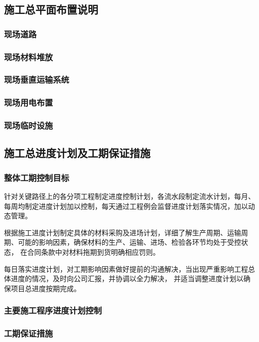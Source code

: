 \subsection{施工总平面布置说明}
\subsubsection{现场道路}
\subsubsection{现场材料堆放}
\subsubsection{现场垂直运输系统}
\subsubsection{现场用电布置}
\subsubsection{现场临时设施}

\subsection{施工总进度计划及工期保证措施}
\subsubsection{整体工期控制目标}

针对关键路径上的各分项工程制定进度控制计划，各流水段制定流水计划，每月、每周均制定进度计划加以控制，每天通过工程例会监督进度计划落实情况，加以动态管理。 

根据施工进度计划制定具体的材料采购及进场计划，详细了解生产周期、运输周期、可能的影响因素，确保材料的生产、运输、进场、检验各环节均处于受控状态，
在合同条款中对材料拖期到货明确相应罚则。

每日落实进度计划，对工期影响因素做好提前的沟通解决，当出现严重影响工程总体进度的情况，及时向公司汇报，并协调以全力解决，
并适当调整进度计划以确保项目总进度按期完成。

\subsubsection{主要施工程序进度计划控制}
\subsubsection{工期保证措施}

